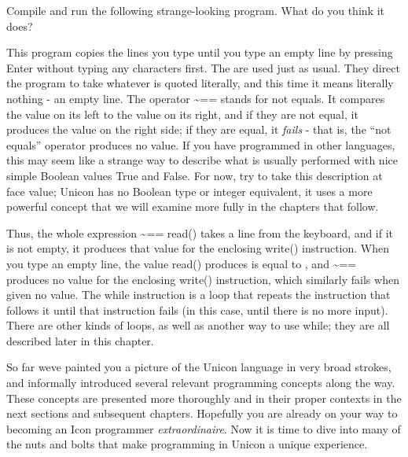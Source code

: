 
\noindent Compile and run the following strange-looking program.
What do you think it does?


This program copies the lines you type until you type an empty line by
pressing Enter without typing any characters first. The
\texttt{{\textquotedbl}{\textquotedbl}} are used just as usual. They
direct the program to take whatever is quoted literally, and this time
it means literally nothing - an empty line. The operator
\textsf{\~{}==} stands for {\textquotedbl}not
equals{\textquotedbl}. It compares the value on its left to the value
on its right, and if they are not equal, it produces the value on the
right side; if they are equal, it \textit{fails} - that is, the {\textquotedblleft}not
equals{\textquotedblright} operator produces no value. If you have
programmed in other languages, this may seem like a strange way to
describe what is usually performed with nice simple Boolean values True
and False. For now, try to take this description at face value; Unicon
has no Boolean type or integer equivalent, it uses a more powerful
concept that we will examine more fully in the chapters that follow.

Thus, the whole expression \textsf{{\textquotedbl}{\textquotedbl} \~{}==
read()} takes a line from the keyboard, and if it is not empty, it
produces that value for the enclosing \textsf{write()} instruction.
When you type an empty line, the value \textsf{read()} produces is
equal to \textsf{{\textquotedbl}{\textquotedbl}}, and \textsf{\~{}==}
produces no value for the enclosing \textsf{write()} instruction, which
similarly fails when given no value. The \textsf{while}
instruction is a {\textquotedbl}loop{\textquotedbl} that
repeats the instruction that follows it until that instruction fails
(in this case, until there is no more input). There are other kinds of
loops, as well as another way to use \textsf{while}; they are all
described later in this chapter.

So far we{\textquotesingle}ve painted you a picture of the Unicon
language in very broad strokes, and informally introduced several
relevant programming concepts along the way. These concepts are
presented more thoroughly and in their proper contexts in the next
sections and subsequent chapters. Hopefully you are already on your way
to becoming an Icon programmer \textit{extraordinaire}. Now it is time
to dive into many of the nuts and bolts that make programming in Unicon
a unique experience.

